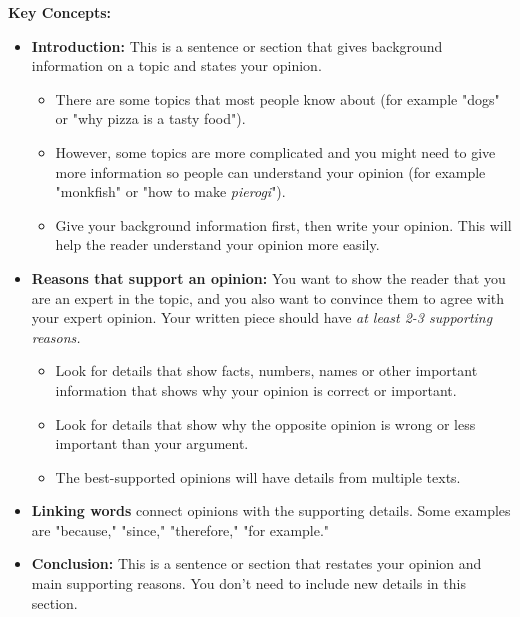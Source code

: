 \documentclass[12pt]{article}
\begin{document}
\begin{tcolorbox}[colframe=black!60, colback=white, 
coltitle=black, colbacktitle=black!15, fonttitle=\bfseries\Large, 
title=Key Concepts and Vocabulary, halign title=center, left=10pt, right=10pt, top=10pt, bottom=15pt]
\textbf{Key Concepts:}
\begin{itemize}
    \item \textbf{Introduction:} This is a sentence or section that gives background information on a topic and states your opinion. 
    \begin{itemize}
        \item There are some topics that most people know about (for example "dogs" or "why pizza is a tasty food").   
        \item However, some topics are more complicated and you might need to give more information so people can understand your opinion (for example "monkfish" or "how to make \textit{pierogi}").
        \item Give your background information first, then write your opinion. This will help the reader understand your opinion more easily.
    \end{itemize}

    \item \textbf{Reasons that support an opinion:} You want to show the reader that you are an expert in the topic, and you also want to convince them to agree with your expert opinion. Your written piece should have \textit{at least 2-3 supporting reasons.}
    \begin{itemize}
        \item Look for details that show facts, numbers, names or other important information that shows why your opinion is correct or important.
        \item Look for details that show why the opposite opinion is wrong or less important than your argument.
        \item The best-supported opinions will have details from multiple texts.
    \end{itemize}
    \item \textbf{Linking words} connect opinions with the supporting details. Some examples are "because," "since," "therefore," "for example."
    \item \textbf{Conclusion:} This is a sentence or section that restates your opinion and main supporting reasons. You don't need to include new details in this section.
    \end{itemize}






\end{tcolorbox}
\end{document}
